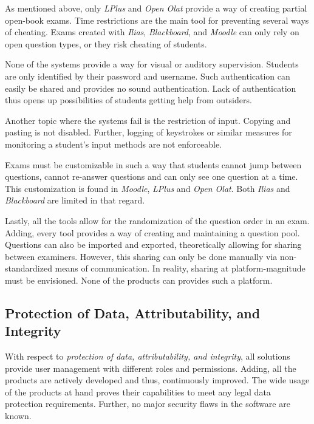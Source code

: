 As mentioned above, only \emph{LPlus} and \emph{Open Olat} provide a way
of creating partial open-book exams. Time restrictions are the main tool
for preventing several ways of cheating. Exams created with
\emph{Ilias}, \emph{Blackboard}, and \emph{Moodle} can only rely on open
question types, or they risk cheating of students.

None of the systems provide a way for visual or auditory supervision.
Students are only identified by their password and username. Such
authentication can easily be shared and provides no sound
authentication. Lack of authentication thus opens up possibilities of
students getting help from outsiders.

Another topic where the systems fail is the restriction of input.
Copying and pasting is not disabled. Further, logging of keystrokes or
similar measures for monitoring a student's input methods are not
enforceable.

Exams must be customizable in such a way that students cannot jump
between questions, cannot re-answer questions and can only see one
question at a time. This customization is found in \emph{Moodle},
\emph{LPlus} and \emph{Open Olat}. Both \emph{Ilias} and
\emph{Blackboard} are limited in that regard.

Lastly, all the tools allow for the randomization of the question order
in an exam. Adding, every tool provides a way of creating and
maintaining a question pool. Questions can also be imported and
exported, theoretically allowing for sharing between examiners. However,
this sharing can only be done manually via non-standardized means of
communication. In reality, sharing at platform-magnitude must be
envisioned. None of the products can provides such a platform.

\hypertarget{protection-of-data-attributability-and-integrity}{%
\subsection{Protection of Data, Attributability, and
Integrity}\label{protection-of-data-attributability-and-integrity}}

With respect to \emph{protection of data, attributability, and
integrity}, all solutions provide user management with different roles
and permissions. Adding, all the products are actively developed and
thus, continuously improved. The wide usage of the products at hand
proves their capabilities to meet any legal data protection
requirements. Further, no major security flaws in the software are
known.

